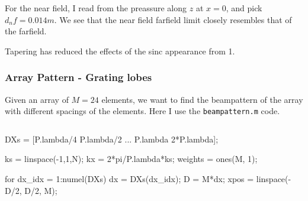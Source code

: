 \documentclass[compress]{beamer}
\newcommand\pin{%
\parbox[t]{10pt}{\raisebox{0.2pt}{\usebeamercolor[fg]{mybullet}{$\ast$}}}}
\begin{document}
\begin{frame}[fragile]
\begin{columns}
\begin{column}{0.5\textwidth}
\begin{figure}
            \end{figure}
        \end{column}
    \end{columns}
    \vspace{1mm}
    For the near field, I read from the preassure along $z$ at $x=0$, and pick
    $d_nf = 0.014m$. We see that the near field farfield limit closely resembles
    that of the farfield.\\
    \pin Tapering has reduced the effects of the sinc appearance from 1.
    
\end{frame}

\begin{frame}[fragile] %
    \frametitle{Array Pattern - Grating lobes}
    Given an array of $M=24$ elements, we want to find the beampattern of the array
    with different spacings of the elements. Here I use the \texttt{beampattern.m} code.
    \begin{columns}
        \begin{column}{0.52\textwidth}
            \begin{jllisting}[gobble=16, language=Matlab]
                DXs = [P.lambda/4   P.lambda/2 ...
                       P.lambda   2*P.lambda];

                ks = linspace(-1,1,N);
                kx = 2*pi/P.lambda*ks;
                weights = ones(M, 1);

                for dx_idx = 1:numel(DXs)
                    dx = DXs(dx_idx);
                    D = M*dx;
                    xpos = linspace(-D/2, D/2, M);
                    

\end{jllisting}
\end{column}
\end{columns}
\end{frame}
\end{document}
